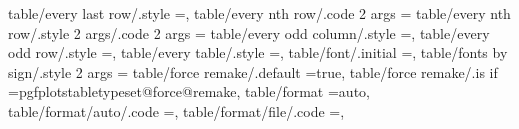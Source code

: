{{{{{{{{{{{{{{{{{{{{{{{{{{{{table/every last row/.style                                        ={},                                                                                                                                
table/every nth row/.code 2 args                                   ={%
table/every nth row/.style 2 args/.code 2 args                     ={%
table/every odd column/.style                                      ={},                                                                                                                                
table/every odd row/.style                                         ={},                                                                                                                                
table/every table/.style                                           ={},                                                                                                                                
table/font/.initial                                                =,                                                                                                                                  
table/fonts by sign/.style 2 args                                  ={%
table/force remake/.default                                        =true,                                                                                                                              
table/force remake/.is if                                          =pgfplotstabletypeset@force@remake,                                                                                                 
table/format                                                       =auto,                                                                                                                              
table/format/auto/.code                                            ={\def\pgfplotstableread@FORMAT@CASE{0}},                                                                                           
table/format/file/.code                                            ={\def\pgfplotstableread@FORMAT@CASE{2}},                                                                                           
}}}}}}}}}}}}}}}}}}}}}}}}}}}}}}}
